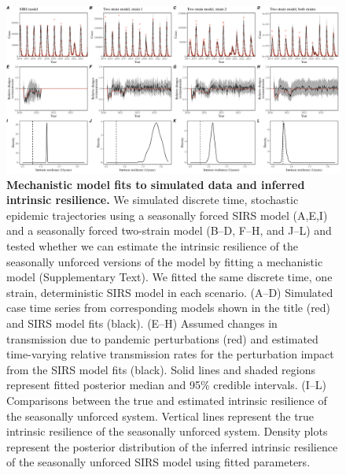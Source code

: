 \documentclass[12pt]{article}
\begin{document}
\begin{figure}[!th]
\includegraphics[width=\textwidth]{../figure_fit/figure_fit.pdf}
\caption{
\textbf{Mechanistic model fits to simulated data and inferred intrinsic resilience.}
We simulated discrete time, stochastic epidemic trajectories using a seasonally forced SIRS model (A,E,I) and a seasonally forced two-strain model (B--D, F--H, and J--L) and tested whether we can estimate the intrinsic resilience of the seasonally unforced versions of the model by fitting a mechanistic model (Supplementary Text).
We fitted the same discrete time, one strain, deterministic SIRS model in each scenario.
(A--D) Simulated case time series from corresponding models shown in the title (red) and SIRS model fits (black).
(E--H) Assumed changes in transmission due to pandemic perturbations (red) and estimated time-varying relative transmission rates for the perturbation impact from the SIRS model fits (black).
Solid lines and shaded regions represent fitted posterior median and 95\% credible intervals.
(I--L) Comparisons between the true and estimated intrinsic resilience of the seasonally unforced system.
Vertical lines represent the true intrinsic resilience of the seasonally unforced system.
Density plots represent the posterior distribution of the inferred intrinsic resilience of the seasonally unforced SIRS model using fitted parameters.
}
\end{figure}


\pagebreak
\end{document}
